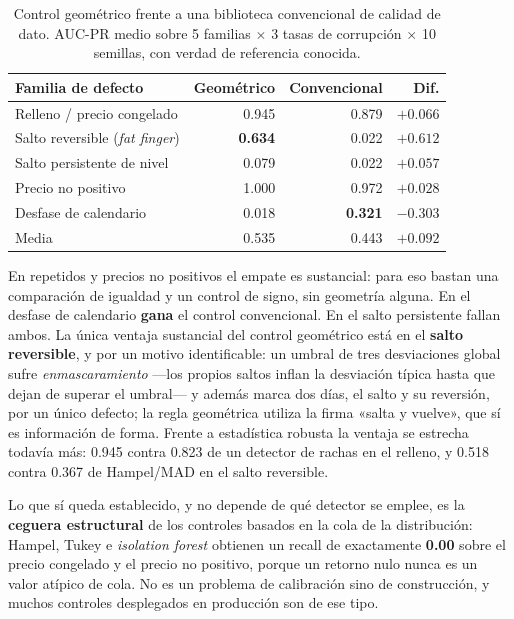 \documentclass[11pt,a4paper]{article}
\begin{document}
\begin{table}[H]
\centering
\footnotesize
\caption{Control geométrico frente a una biblioteca convencional de calidad de
dato. AUC-PR medio sobre 5 familias $\times$ 3 tasas de corrupción $\times$ 10
semillas, con verdad de referencia conocida.}
\label{tab:dqvsestandar}
\begin{tabular}{lrrr}
\toprule
\textbf{Familia de defecto} & \textbf{Geométrico} & \textbf{Convencional} & \textbf{Dif.} \\
\midrule
Relleno / precio congelado & 0.945 & 0.879 & $+0.066$ \\
Salto reversible (\emph{fat finger}) & \textbf{0.634} & 0.022 & $\mathbf{+0.612}$ \\
Salto persistente de nivel & 0.079 & 0.022 & $+0.057$ \\
Precio no positivo & 1.000 & 0.972 & $+0.028$ \\
Desfase de calendario & 0.018 & \textbf{0.321} & $\mathbf{-0.303}$ \\
\midrule
Media & 0.535 & 0.443 & $+0.092$ \\
\bottomrule
\end{tabular}
\end{table}

En repetidos y precios no positivos el empate es sustancial: para eso bastan una
comparación de igualdad y un control de signo, sin geometría alguna. En el
desfase de calendario \textbf{gana} el control convencional. En el salto
persistente fallan ambos. La única ventaja sustancial del control geométrico está
en el \textbf{salto reversible}, y por un motivo identificable: un umbral de tres
desviaciones global sufre \emph{enmascaramiento} —los propios saltos inflan la
desviación típica hasta que dejan de superar el umbral— y además marca dos días,
el salto y su reversión, por un único defecto; la regla geométrica utiliza la
firma «salta y vuelve», que sí es información de forma. Frente a estadística
robusta la ventaja se estrecha todavía más: 0.945 contra 0.823 de un detector de
rachas en el relleno, y 0.518 contra 0.367 de Hampel/MAD en el salto reversible.

Lo que sí queda establecido, y no depende de qué detector se emplee, es la
\textbf{ceguera estructural} de los controles basados en la cola de la
distribución: Hampel, Tukey e \emph{isolation forest} obtienen un recall de
exactamente \textbf{0.00} sobre el precio congelado y el precio no positivo,
porque un retorno nulo nunca es un valor atípico de cola. No es un problema de
calibración sino de construcción, y muchos controles desplegados en producción
son de ese tipo.
\end{document}
